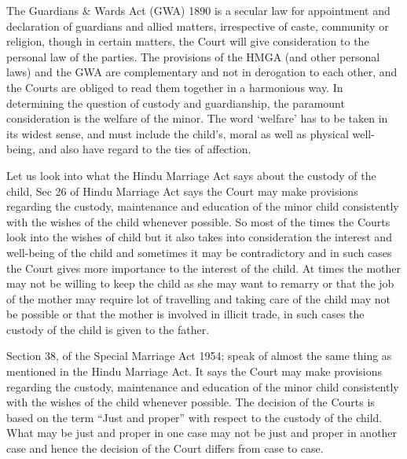 \begin{multicols}{2}
\noi
The Guardians \& Wards Act (GWA) 1890 is a secular law for appointment and declaration of
guardians and allied matters, irrespective of caste, community or religion, though in certain
matters, the Court will give consideration to the personal law of the parties. The provisions of the
HMGA (and other personal laws) and the GWA are complementary and not in derogation to each
other, and the Courts are obliged to read them together in a harmonious way. In determining the
question of custody and guardianship, the paramount consideration is the welfare of the minor.
The word `welfare' has to be taken in its widest sense, and must include the child's, moral as well
as physical well-being, and also have regard to the ties of affection.

\noi
Let us look into what the Hindu Marriage Act says about the custody of the child, Sec 26 of Hindu
Marriage Act says the Court may make provisions regarding the custody, maintenance and
education of the minor child consistently with the wishes of the child whenever possible. So most
of the times the Courts look into the wishes of child but it also takes into consideration the interest
and well-being of the child and sometimes it may be contradictory and in such cases the Court
gives more importance to the interest of the child. At times the mother may not be willing to keep
the child as she may want to remarry or that the job of the mother may require lot of travelling
and taking care of the child may not be possible or that the mother is involved in illicit trade, in
such cases the custody of the child is given to the father.

\noi
Section 38, of the Special Marriage Act 1954; speak of almost the same thing as mentioned in the
Hindu Marriage Act. It says the Court may make provisions regarding the custody, maintenance
and education of the minor child consistently with the wishes of the child whenever possible. The
decision of the Courts is based on the term “Just and proper” with respect to the custody of the
child. What may be just and proper in one case may not be just and proper in another case and
hence the decision of the Court differs from case to case.


\end{multicols}
